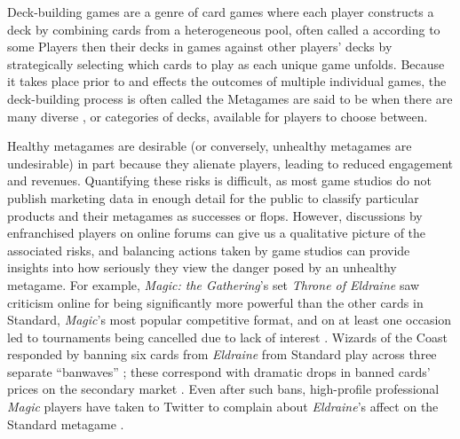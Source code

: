 

Deck-building games are a genre of card games where each player
constructs a deck by combining cards from a heterogeneous pool, often
called a  according to some  Players then  their decks in games against
other players' decks by strategically selecting which cards to play as
each unique game unfolds. Because it takes place prior to and effects
the outcomes of multiple individual games, the deck-building process
is often called the   Metagames are said to be
 when there are many diverse , or
categories of decks, available for players to choose between.

Healthy metagames are desirable (or conversely, unhealthy metagames
are undesirable) in part because they alienate players, leading to
reduced engagement and revenues. Quantifying these risks is difficult,
as most game studios do not publish marketing data in enough detail
for the public to classify particular products and their metagames as
successes or flops. However, discussions by enfranchised players on
online forums can give us a qualitative picture of the associated
risks, and balancing actions taken by game studios can provide
insights into how seriously they view the danger posed by an unhealthy
metagame. For example, \textit{Magic: the Gathering}'s set
\textit{Throne of Eldraine} saw criticism online for being
significantly more powerful than the other cards in Standard,
\textit{Magic}'s most popular competitive format, and on at least one
occasion led to tournaments being cancelled due to lack of interest
\cite{oko-meta-drama}. Wizards of the Coast responded by banning six
cards from \textit{Eldraine} from Standard play across three separate
``banwaves'' \cite{mtg-banlist, mtg-bnr-nov-2019, mtg-bnr-jun-2020,
mtg-bnr-aug-2020}; these correspond with dramatic drops in banned
cards' prices on the secondary market
\cite{tcgplayer-bans-financial-impact}. Even after such bans,
high-profile professional \textit{Magic} players have taken to Twitter
to complain about \textit{Eldraine}'s affect on the Standard metagame
\cite{lsv-eldraine-complaints}.

